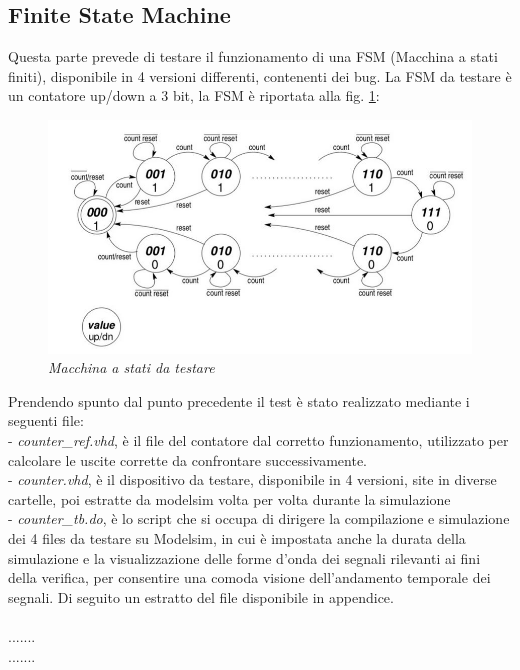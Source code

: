 \\
\\
\\
\subsection{Finite State Machine}
Questa parte prevede di testare il  funzionamento di una FSM (Macchina a stati finiti), disponibile in 4 versioni differenti, contenenti dei bug.  
La FSM da testare è un contatore up/down a 3 bit, la FSM è riportata alla fig. \ref{fsm_lab6}:
\begin{figure}[!htb]
	\centering
	\includegraphics[scale=0.8]{immagini/fsm_lab6}
	\caption{\textit{Macchina a stati da testare}}
	\label{fsm_lab6}
\end{figure}
Prendendo spunto dal punto precedente il test è stato realizzato mediante i seguenti file:\\
- \textit{counter\_ref.vhd}, è il file del contatore dal corretto funzionamento, utilizzato per calcolare le uscite corrette da confrontare successivamente.
\\
- \textit{counter.vhd}, è il dispositivo da testare, disponibile in 4 versioni, site in diverse cartelle, poi estratte da modelsim volta per volta durante la simulazione
\\
- \textit{counter\_tb.do}, è lo script che si occupa di dirigere la compilazione e simulazione dei 4 files da testare su Modelsim, in cui è impostata anche la durata della simulazione e la visualizzazione delle forme d’onda dei segnali rilevanti ai fini della verifica, per consentire una comoda visione dell’andamento temporale dei segnali.
Di seguito un estratto del file disponibile in appendice.\\
\\
.......\\
.......\\
